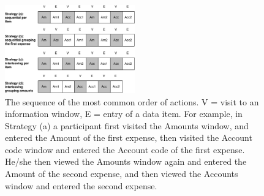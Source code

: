
\begin{figure}[!ht]
  \centering
    \includegraphics[width=0.5\textwidth]{images/ch34/ch34-4_OrderStrategies.pdf}
      \caption[Study 4 most common order of actions]{The sequence of the most common order of actions. V = visit to an information window, E = entry of a data item. For example, in Strategy (a) a participant first visited the Amounts window, and entered the Amount of the first expense, then visited the Account code window and entered the Account code of the first expense. He/she then viewed the Amounts window again and entered the Amount of the second expense, and then viewed the Accounts window and entered the second expense.}
          \label{fig:ch34_4-groupstr}
\end{figure}

